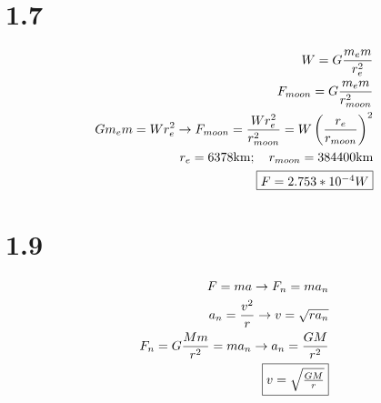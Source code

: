 \documentclass[12 pt]{article}
\begin{document}
\pagebreak
\section*{1.7}
\begin{align*}
    W=G\frac{m_e m}{r_e^2} \\
    F_{moon}=G\frac{m_e m}{r_{moon}^2} \\
    Gm_e m=Wr_e^2 \rightarrow F_{moon}=\frac{Wr_e^2}{r_{moon}^2}=W\left( \frac{r_e}{r_{moon}}\right) ^2 \\
    r_e=6378\textrm{km}; \quad r_{moon}=384400\textrm{km} \\
    \fbox{$F=2.753*10^{-4}W$}
\end{align*}

\section*{1.9}
\begin{align*}
    F=ma \rightarrow F_n=ma_n \\
    a_n=\frac{v^2}{r} \rightarrow v=\sqrt{ra_n} \\
    F_n=G\frac{Mm}{r^2}=ma_n \rightarrow a_n=\frac{GM}{r^2} \\
    \fbox{$v=\sqrt{\frac{GM}{r}}$}
\end{align*}

\pagebreak
\end{document}
